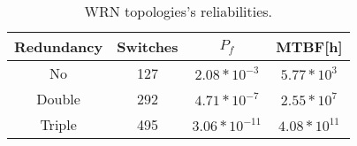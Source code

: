 
\begin{table}[ht]

\caption{WRN topologies's reliabilities.}
\centering

\begin{tabular}{| c | c | c | c |}        \hline
\rowcolor{gray!35}{}
{\bf Redundancy}& \textbf{Switches}  & $P_f$                       & MTBF[h]               \\ \hline
No              &  127               & $ 2.08*10^{-3}$             & $ 5.77*10^{3}$        \\ \hline
Double          &  292               & $ 4.71*10^{-7}$             &  $ 2.55*10^{7}$       \\ \hline
Triple          &  495               & $ 3.06*10^{-11}$            &  $ 4.08*10^{11}$      \\ \hline
\end{tabular}
\label{tab:2000nodesReliability}
\end{table}

